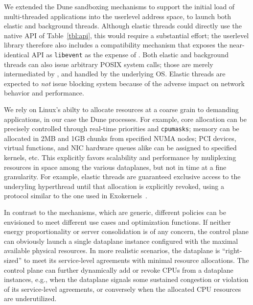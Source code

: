  We extended the Dune
sandboxing mechanisms to support the initial load of multi-threaded
applications into the userlevel address space, to launch both elastic
and background threads.  Although elastic threads could directly use
the native API of Table~\ref{tbl:api}, this would require a
substantial effort; the userlevel library therefore also includes a
compatibility mechanism that exposes the near-identical API as
\texttt{libevent} as the expense of .  Both
elastic and background threads can also issue arbitrary POSIX system
calls; those are merely intermediated by \ix, and handled by the
underlying OS.  Elastic threads are expected to \emph{not} issue blocking
system because of the adverse impact on network behavior and
performance.

We rely on Linux's abilty to allocate resources at a coarse grain to
demanding applications, in our case the Dune processes.  For example,
core allocation can be precisely controlled through real-time
priorities and \texttt{cpumasks}; memory can be allocated in 2MB and
1GB chunks from specified NUMA nodes; PCI devices, virtual functions,
and NIC hardware queues alike can be assigned to specified \ix
kernels, etc.  This explicitly favors scalability and performance by
muliplexing resources in space among the various dataplanes, but not
in time at a fine granularity.  For example, elastic threads are
guaranteed exclusive access to the underyling hyperthread until that
allocation is explicitly revoked, using a protocol similar to the one
used in Exokernels~\cite{DBLP:conf/sosp/EnglerKO95}.  

In contrast to the mechanisms, which are generic, different policies
can be envisioned to meet different use cases and optimization
functions.  If neither energy proportionality or server consolidation
is of any concern, the control plane can obviously launch a single
dataplane instance configured with the maximal available physical
resources.  In more realistic scenarios, the dataplane is
``right-sized'' to meet its service-level agreements with minimal
resource allocations.  The control plane can further dynamically add
or revoke CPUs from a dataplane instances, e.g., when the dataplane
signals some sustained congestion or violation of its service-level
agreements, or conversely when the allocated CPU resources are
underutilized.

%

